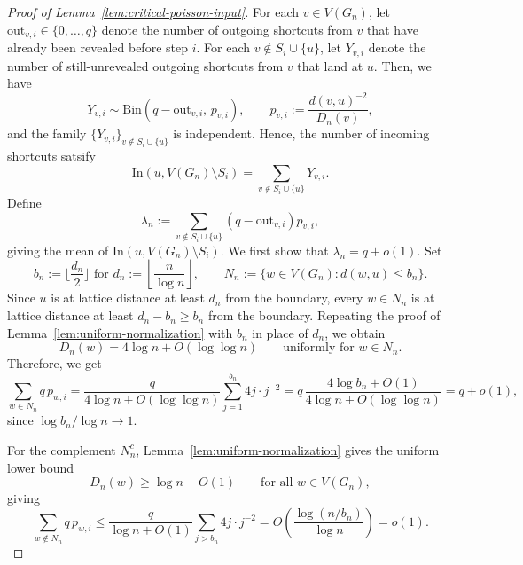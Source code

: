 \documentclass[10pt]{amsart}
\begin{document}
\begin{proof}[Proof of Lemma~\ref{lem:critical-poisson-input}]
For each \(v\in V(G_n)\), let \(\mathrm{out}_{v,i}\in\{0,\dots,q\}\) denote the
number of outgoing shortcuts from \(v\) that have already been revealed before
step \(i\). For each \(v\notin S_i\cup\{u\}\), let \(Y_{v,i}\) denote the number
of still-unrevealed outgoing shortcuts from \(v\) that land at \(u\). Then, we have
\[
Y_{v,i}\sim \mathrm{Bin}\!\left(q-\mathrm{out}_{v,i},\,p_{v,i}\right),
\qquad
p_{v,i}:=\frac{d(v,u)^{-2}}{D_n(v)},
\]
and the family \(\{Y_{v,i}\}_{v\notin S_i\cup\{u\}}\) is independent. Hence, the number of incoming shortcuts satsify
\[
\mathrm{In}(u,V(G_n)\setminus S_i)
=\sum_{v\notin S_i\cup\{u\}} Y_{v,i}.
\]
Define
\[
\lambda_n:=\sum_{v\notin S_i\cup\{u\}} (q-\mathrm{out}_{v,i})p_{v,i},
\]
giving the mean of \(\mathrm{In}(u,V(G_n)\setminus S_i)\). We
first show that \(\lambda_n=q+o(1)\).
Set
\[
b_n:=\Big\lfloor \frac{d_n}{2}\Big\rfloor \text{ for } 
d_n:=\left\lfloor \frac{n}{\log n}\right\rfloor,
\qquad
N_n:=\{w\in V(G_n): d(w,u)\le b_n\}.
\]
Since \(u\) is at lattice distance at least \(d_n\) from the boundary, every
\(w\in N_n\) is at lattice distance at least \(d_n-b_n\ge b_n\) from the
boundary. Repeating the proof of Lemma~\ref{lem:uniform-normalization} with
\(b_n\) in place of \(d_n\), we obtain
\[
D_n(w)=4\log n+O(\log\log n)
\qquad\text{uniformly for }w\in N_n.
\]
Therefore, we get
\[
\sum_{w\in N_n} q\,p_{w,i}
=\frac{q}{4\log n+O(\log\log n)}\sum_{j=1}^{b_n}4j\cdot j^{-2}
=q\,\frac{4\log b_n+O(1)}{4\log n+O(\log\log n)}
=q+o(1),
\]
since \(\log b_n/\log n\to 1\).

For the complement \(N_n^c\), Lemma~\ref{lem:uniform-normalization} gives the
uniform lower bound
\[
D_n(w)\ge \log n+O(1)
\qquad\text{for all }w\in V(G_n),
\]
giving
\[
\sum_{w\notin N_n} q\,p_{w,i}
\le \frac{q}{\log n+O(1)}\sum_{j>b_n}4j\cdot j^{-2}
=O\!\left(\frac{\log(n/b_n)}{\log n}\right)
=o(1).
\]


\end{proof}
\end{document}
